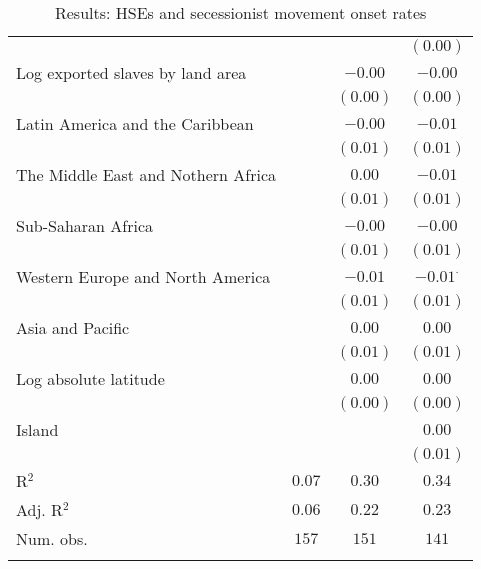 \begin{table}[H]
\begin{center}
{\begin{tabular}{l c c c}
                                  &              &                & $(0.00)$        \\
Log exported slaves by land area  &              & $-0.00$        & $-0.00$         \\
                                  &              & $(0.00)$       & $(0.00)$        \\
Latin America and the Caribbean   &              & $-0.00$        & $-0.01$         \\
                                  &              & $(0.01)$       & $(0.01)$        \\
The Middle East and Nothern Africa &              & $0.00$         & $-0.01$         \\
                                  &              & $(0.01)$       & $(0.01)$        \\
Sub-Saharan Africa                &              & $-0.00$        & $-0.00$         \\
                                  &              & $(0.01)$       & $(0.01)$        \\
Western Europe and North America  &              & $-0.01$        & $-0.01^{\cdot}$ \\
                                  &              & $(0.01)$       & $(0.01)$        \\
Asia and Pacific                  &              & $0.00$         & $0.00$          \\
                                  &              & $(0.01)$       & $(0.01)$        \\
Log absolute latitude             &              & $0.00$         & $0.00$          \\
                                  &              & $(0.00)$       & $(0.00)$        \\
Island                            &              &                & $0.00$          \\
                                  &              &                & $(0.01)$        \\
\hline
R$^2$                             & $0.07$       & $0.30$         & $0.34$          \\
Adj. R$^2$                        & $0.06$       & $0.22$         & $0.23$          \\
Num. obs.                         & $157$        & $151$          & $141$           \\
\hline
\multicolumn{4}{l}{\scriptsize{}}
\end{tabular}
}
\caption{Results: HSEs and secessionist movement onset rates}
\label{SecTable}
\end{center}
\end{table}
